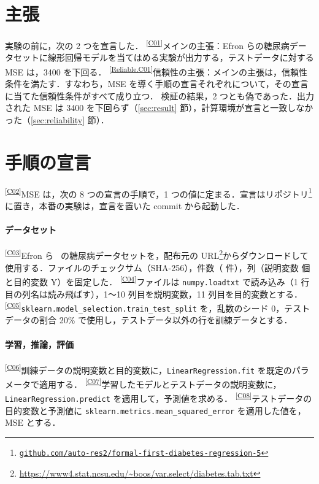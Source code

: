 \documentclass[9pt,a4paper,twocolumn]{ltjsarticle}
\newcommand{\repositoryurl}{https://github.com/auto-res2/formal-first-diabetes-regression-5}
\newcommand{\schemaurl}{\repositoryurl/blob/\SchemaCommit/formal/claims.json}
\newcommand{\cid}[1]{\textsuperscript{\textsf{\scriptsize[\href{\schemaurl\#L\csname line#1\endcsname}{#1}]}}}
\newcommand{\code}[1]{\texttt{\small #1}}
\begin{document}

\section{主張}

実験の前に，次の 2 つを宣言した．
\cid{C01}メインの主張：Efron らの糖尿病データセットに線形回帰モデルを当てはめる実験が出力する，テストデータに対する MSE は，3400 を下回る．
\cid{Reliable.C01}信頼性の主張：メインの主張は，信頼性条件を満たす．すなわち，MSE を導く手順の宣言それぞれについて，その宣言に当てた信頼性条件がすべて成り立つ．
検証の結果，2 つとも偽であった．出力された MSE は 3400 を下回らず（\ref{sec:result} 節），計算環境が宣言と一致しなかった（\ref{sec:reliability} 節）．

\section{手順の宣言}

\cid{C02}MSE は，次の 8 つの宣言の手順で，1 つの値に定まる．宣言はリポジトリ\footnote{\href{\repositoryurl}{\nolinkurl{github.com/auto-res2/formal-first-diabetes-regression-5}}}に置き，本番の実験は，宣言を置いた commit から起動した．

\paragraph{データセット}
\cid{C03}Efron ら~\cite{efron} の糖尿病データセットを，配布元の URL\footnote{\url{https://www4.stat.ncsu.edu/~boos/var.select/diabetes.tab.txt}}からダウンロードして使用する．ファイルのチェックサム（SHA-256），件数（\NSamples{} 件），列（説明変数 \NFeatures{} 個と目的変数 Y）を固定した．
\cid{C04}ファイルは \code{numpy.loadtxt} で読み込み（1 行目の列名は読み飛ばす），1〜10 列目を説明変数，11 列目を目的変数とする．
\cid{C05}\code{sklearn.model\_selection.train\_test\_split} を，乱数のシード 0，テストデータの割合 20\% で使用し，テストデータ以外の行を訓練データとする．

\paragraph{学習，推論，評価}
\cid{C06}訓練データの説明変数と目的変数に，\code{LinearRegression.fit} を既定のパラメータで適用する．
\cid{C07}学習したモデルとテストデータの説明変数に，\code{LinearRegression.predict} を適用して，予測値を求める．
\cid{C08}テストデータの目的変数と予測値に \code{sklearn.metrics.mean\_squared\_error} を適用した値を，MSE とする．
\end{document}
